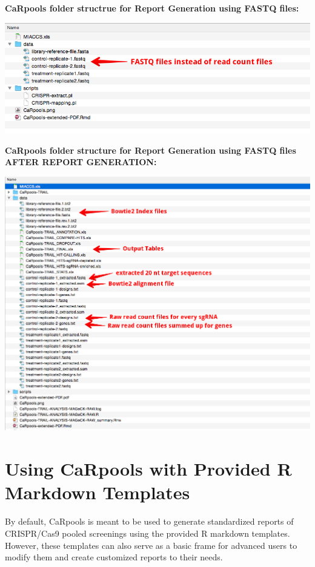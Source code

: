 \documentclass[]{article}
\begin{document}
\newpage

\textbf{CaRpools folder structrue for Report Generation using FASTQ
files:}

\includegraphics{./pictures/folder-structure-FASTQ-before.png}

\newpage

\textbf{CaRpools folder structure for Report Generation using FASTQ
files AFTER REPORT GENERATION:}

\includegraphics{./pictures/folder-structure-FASTQ-FINAL.png}

\newpage

\section{Using CaRpools with Provided R Markdown
Templates}\label{using-carpools-with-provided-r-markdown-templates}

By default, CaRpools is meant to be used to generate standardized
reports of CRISPR/Cas9 pooled screenings using the provided R markdown
templates.\\
However, these templates can also serve as a basic frame for advanced
users to modify them and create customized reports to their needs.
\end{document}
